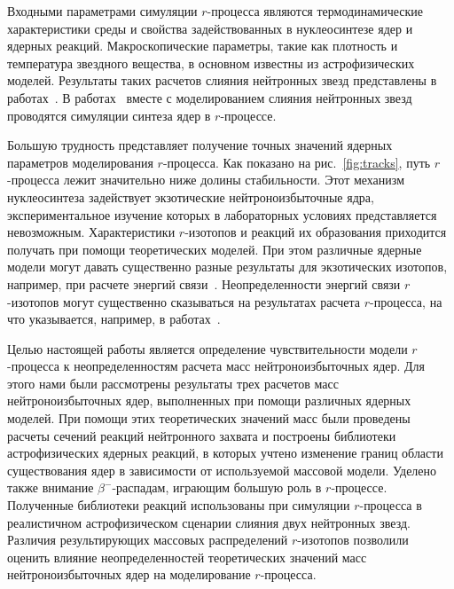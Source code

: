 Входными параметрами симуляции $r$-процесса являются термодинамические характеристики среды и свойства задействованных в нуклеосинтезе ядер и ядерных реакций. Макроскопические параметры, такие как плотность и температура звездного вещества, в основном известны из астрофизических моделей. Результаты таких расчетов слияния нейтронных звезд представлены в работах~\cite{rosswog1999,rosswog2013}. В работах~\cite{korobkin2012,rosswog2014,kullman2021} вместе с моделированием слияния нейтронных звезд проводятся симуляции синтеза ядер в $r$-процессе.

Большую трудность представляет получение точных значений ядерных параметров моделирования $r$-процесса. Как показано на рис.~\ref{fig:tracks}, путь $r$-процесса лежит значительно ниже долины стабильности. Этот механизм нуклеосинтеза задействует экзотические нейтроноизбыточные ядра, экспериментальное изучение которых в лабораторных условиях представляется невозможным. Характеристики $r$-изотопов и реакций их образования приходится получать при помощи теоретических моделей. При этом различные ядерные модели могут давать существенно разные результаты для экзотических изотопов, например, при расчете энергий связи~\cite{sobiczewski2018}. Неопределенности энергий связи $r$-изотопов могут существенно сказываться на результатах расчета $r$-процесса, на что указывается, например, в работах~\cite{goriely2001,brett2012}.

Целью настоящей работы является определение чувствительности модели $r$-процесса к неопределенностям расчета масс нейтроноизбыточных ядер. Для этого нами были рассмотрены результаты трех расчетов масс нейтроноизбыточных ядер, выполненных при помощи различных ядерных моделей. При помощи этих теоретических значений масс были проведены расчеты сечений реакций нейтронного захвата и построены библиотеки астрофизических ядерных реакций, в которых учтено изменение границ области существования ядер в зависимости от используемой массовой модели. Уделено также внимание $\beta^-$-распадам, играющим большую роль в $r$-процессе. Полученные библиотеки реакций использованы при симуляции $r$-процесса в реалистичном астрофизическом сценарии слияния двух нейтронных звезд. Различия результирующих массовых распределений $r$-изотопов позволили оценить влияние неопределенностей теоретических значений масс нейтроноизбыточных ядер на моделирование $r$-процесса.

